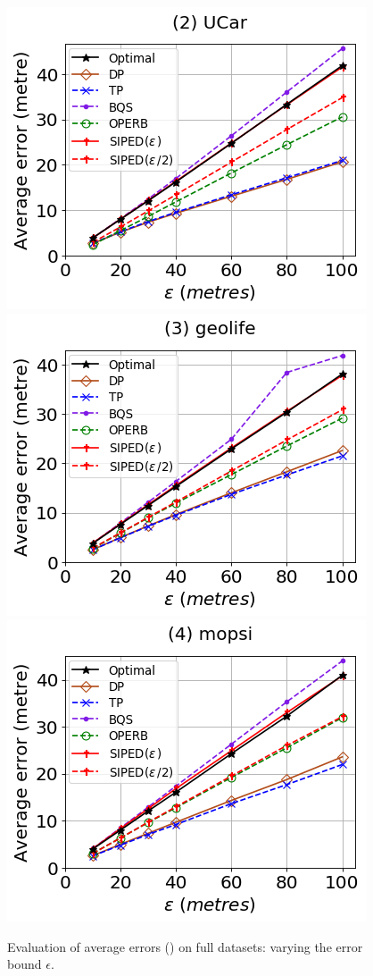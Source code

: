 \begin{figure}[tb!]
	\centering
	\includegraphics[scale=0.320]{Figures/Exp-PED-error-epsilon-service.png}	\hspace{3ex}
	\includegraphics[scale=0.320]{Figures/Exp-PED-error-epsilon-geolife.png}	\hspace{3ex}
	\includegraphics[scale=0.320]{Figures/Exp-PED-error-epsilon-mopsi.png}	
	\vspace{-2ex}
	\caption{\small Evaluation of average errors (\ped) on full datasets: varying the error bound $\epsilon$.}
	\label{fig:ae-ped-epsilon}
	\vspace{-2ex}
\end{figure}

